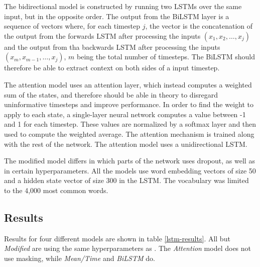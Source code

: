  The bidirectional model is constructed by
running two \acp{LSTM} over the same input, but in the opposite order. The
output from the BiLSTM layer is a sequence of vectors where, for each
timestep $j$, the vector is the concatenation of the output from the forwards
\ac{LSTM} after processing the inputs $(x_1, x_2, \ldots, x_j)$ and the
output from tha backwards \ac{LSTM} after processing the inputs $(x_m,
x_{m-1}, \ldots, x_j)$, $m$ being the total number of timesteps. The BiLSTM
should therefore be able to extract context on both sides of a input
timestep.


The attention model uses an attention layer, which instead computes a
weighted sum of the states, and therefore should be able in theory to
disregard uninformative timesteps and improve performance. In order to find
the weight to apply to each state, a single-layer neural network computes a
value between -1 and 1 for each timestep. These values are normalized by a
softmax layer and then used to compute the weighted average. The attention
mechanism is trained along with the rest of the network. The attention model
uses a unidirectional \ac{LSTM}.

The modified model differs in which parts of the network uses dropout, as
well as in certain hyperparameters. All the models use word embedding vectors
of size 50 and a hidden state vector of size 300 in the \ac{LSTM}. The
vocabulary was limited to the 4,000 most common words.


\subsection{Results}

Results for four different models are shown in table \ref{lstm-results}. All
but \emph{Modified} are using the same hyperparameters as
\citeauthor{taghipour16}. The \emph{Attention} model does not use masking,
while \emph{Mean/Time} and \emph{BiLSTM} do.

